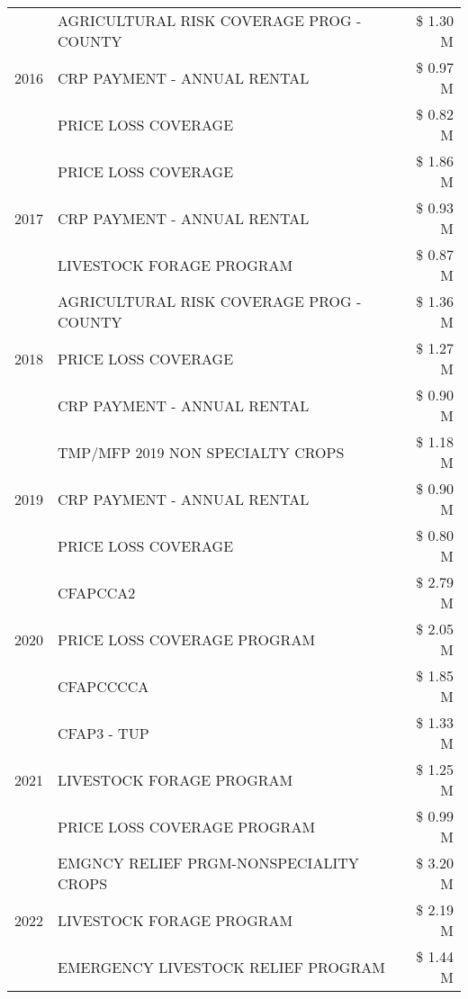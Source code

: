 \begin{tabular}{llr}
\cline{1-3}
\multirow[t]{3}{*}{2016} & AGRICULTURAL RISK COVERAGE PROG - COUNTY & \$ 1.30 M \\
 & CRP PAYMENT - ANNUAL RENTAL & \$ 0.97 M \\
 & PRICE LOSS COVERAGE & \$ 0.82 M \\
\cline{1-3}
\multirow[t]{3}{*}{2017} & PRICE LOSS COVERAGE & \$ 1.86 M \\
 & CRP PAYMENT - ANNUAL RENTAL & \$ 0.93 M \\
 & LIVESTOCK FORAGE PROGRAM & \$ 0.87 M \\
\cline{1-3}
\multirow[t]{3}{*}{2018} & AGRICULTURAL RISK COVERAGE PROG - COUNTY & \$ 1.36 M \\
 & PRICE LOSS COVERAGE & \$ 1.27 M \\
 & CRP PAYMENT - ANNUAL RENTAL & \$ 0.90 M \\
\cline{1-3}
\multirow[t]{3}{*}{2019} & TMP/MFP 2019 NON SPECIALTY CROPS & \$ 1.18 M \\
 & CRP PAYMENT - ANNUAL RENTAL & \$ 0.90 M \\
 & PRICE LOSS COVERAGE & \$ 0.80 M \\
\cline{1-3}
\multirow[t]{3}{*}{2020} & CFAPCCA2 & \$ 2.79 M \\
 & PRICE LOSS COVERAGE PROGRAM & \$ 2.05 M \\
 & CFAPCCCCA & \$ 1.85 M \\
\cline{1-3}
\multirow[t]{3}{*}{2021} & CFAP3 - TUP & \$ 1.33 M \\
 & LIVESTOCK FORAGE PROGRAM & \$ 1.25 M \\
 & PRICE LOSS COVERAGE PROGRAM & \$ 0.99 M \\
\cline{1-3}
\multirow[t]{3}{*}{2022} & EMGNCY RELIEF PRGM-NONSPECIALITY CROPS & \$ 3.20 M \\
 & LIVESTOCK FORAGE PROGRAM & \$ 2.19 M \\
 & EMERGENCY LIVESTOCK RELIEF PROGRAM & \$ 1.44 M \\
\cline{1-3}
\bottomrule
\end{tabular}
